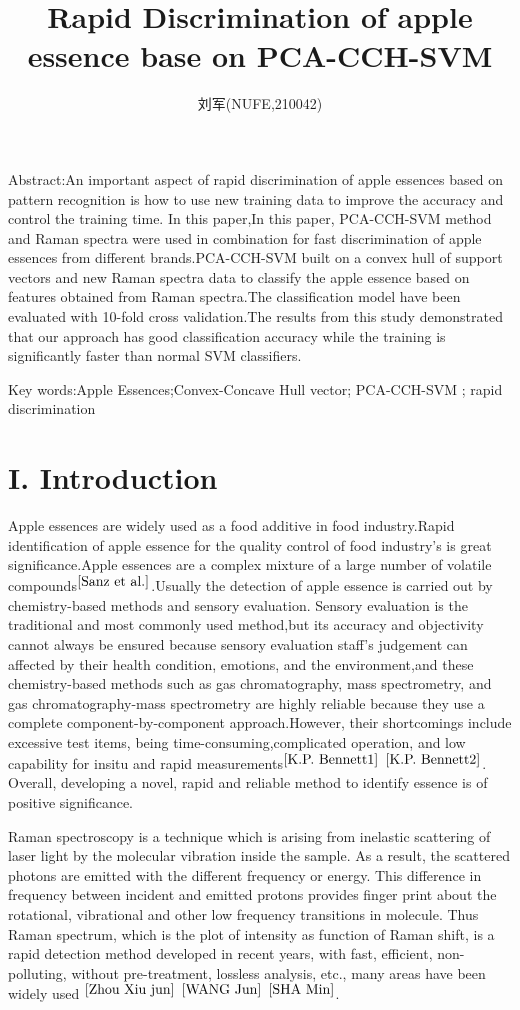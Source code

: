 \documentclass[a4paper]{article}
\author{刘军(NUFE,210042)}
\date{}
\title{Rapid Discrimination of apple essence base on PCA-CCH-SVM  }
\begin{document}
\maketitle

Abstract:An important aspect of rapid discrimination of apple essences based on pattern recognition is how to use new training data to improve the accuracy and control the training time. In this paper,In this paper, PCA-CCH-SVM method and Raman spectra were used in combination for fast discrimination of apple essences from different brands.PCA-CCH-SVM built on a convex hull of support vectors and new Raman spectra data to classify the apple essence based on features obtained from Raman spectra.The classification model have been evaluated with 10-fold cross validation.The results from this study demonstrated that our approach has good classiﬁcation accuracy while the training is signiﬁcantly faster than normal SVM classiﬁers.

Key words:Apple Essences;Convex-Concave Hull vector; PCA-CCH-SVM ; rapid discrimination
\section{I. Introduction}
Apple essences are widely used as a food additive in food industry.Rapid identification of apple essence for the quality control of food industry's  is great significance.Apple essences are a complex mixture of a large number of volatile compounds$^{\cite{Sanz et al.}}$.Usually the detection of apple essence is carried out by chemistry-based methods and sensory evaluation. Sensory evaluation is the traditional and most commonly used method,but its accuracy and objectivity cannot always be ensured because sensory evaluation staff’s judgement can affected by their health condition, emotions, and the environment,and these chemistry-based methods such as gas chromatography, mass spectrometry, and gas chromatography-mass spectrometry are highly reliable because they use a complete component-by-component approach.However, their shortcomings include excessive test items, being time-consuming,complicated operation, and low capability for insitu and rapid measurements$^{\cite{K.P. Bennett1}}$ $^{\cite{K.P. Bennett2}}$. Overall, developing a novel, rapid and reliable method to identify  essence is of positive significance.

Raman spectroscopy is a technique which is arising from inelastic scattering of laser light by the molecular vibration inside the sample. As a result, the scattered photons are emitted with the different frequency or energy. This difference in frequency between incident and emitted protons provides finger print about the rotational, vibrational and other low frequency transitions in molecule. Thus Raman spectrum, which is the plot of intensity as function of Raman shift, is a rapid detection method developed in recent years, with fast, efficient, non-polluting, without pre-treatment, lossless analysis, etc., many areas have been widely used $^{\cite{Zhou Xiu jun}}$
$^{\cite{WANG Jun}}$ $^{\cite{SHA Min}}$.
\end{document}
